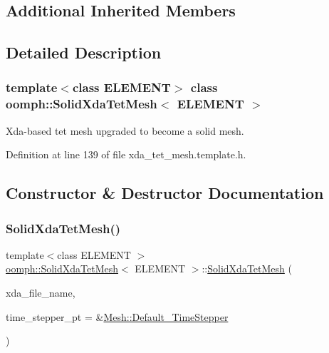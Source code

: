 \subsection*{Additional Inherited Members}


\subsection{Detailed Description}
\subsubsection*{template$<$class E\+L\+E\+M\+E\+NT$>$\newline
class oomph\+::\+Solid\+Xda\+Tet\+Mesh$<$ E\+L\+E\+M\+E\+N\+T $>$}

Xda-\/based tet mesh upgraded to become a solid mesh. 

Definition at line 139 of file xda\+\_\+tet\+\_\+mesh.\+template.\+h.



\subsection{Constructor \& Destructor Documentation}
\mbox{\label{classoomph_1_1SolidXdaTetMesh_a1242b23a2df9f424ec17aa2059ba116d}} 
\subsubsection{\texorpdfstring{Solid\+Xda\+Tet\+Mesh()}{SolidXdaTetMesh()}}
{\footnotesize\ttfamily template$<$class E\+L\+E\+M\+E\+NT $>$ \\
\hyperlink{classoomph_1_1SolidXdaTetMesh}{oomph\+::\+Solid\+Xda\+Tet\+Mesh}$<$ E\+L\+E\+M\+E\+NT $>$\+::\hyperlink{classoomph_1_1SolidXdaTetMesh}{Solid\+Xda\+Tet\+Mesh} (\begin{DoxyParamCaption}\item[{const std\+::string}]{xda\+\_\+file\+\_\+name,  }\item[{\hyperlink{classoomph_1_1TimeStepper}{Time\+Stepper} $\ast$}]{time\+\_\+stepper\+\_\+pt = {\ttfamily \&\hyperlink{classoomph_1_1Mesh_a12243d0fee2b1fcee729ee5a4777ea10}{Mesh\+::\+Default\+\_\+\+Time\+Stepper}} }\end{DoxyParamCaption})\hspace{0.3cm}{\ttfamily [inline]}}



